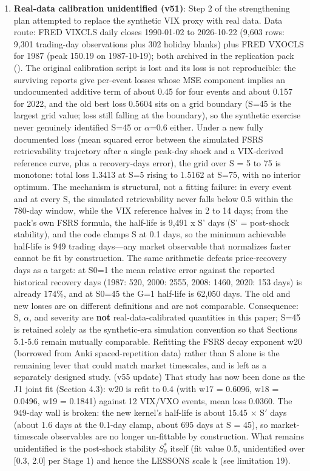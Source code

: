 \documentclass[11pt]{article}
\begin{document}
\begin{enumerate}
\item \textbf{Real-data calibration unidentified (v51)}: Step 2 of the strengthening plan attempted to replace the synthetic VIX proxy with real data. Data route: FRED VIXCLS daily closes 1990-01-02 to 2026-10-22 (9,603 rows: 9,301 trading-day observations plus 302 holiday blanks) plus FRED VXOCLS for 1987 (peak 150.19 on 1987-10-19); both archived in the replication pack (). The original calibration script is lost and its loss is not reproducible: the surviving reports give per-event losses whose MSE component implies an undocumented additive term of about 0.45 for four events and about 0.157 for 2022, and the old best loss 0.5604 sits on a grid boundary (S=45 is the largest grid value; loss still falling at the boundary), so the synthetic exercise never genuinely identified S=45 or $\alpha$=0.6 either. Under a new fully documented loss (mean squared error between the simulated FSRS retrievability trajectory after a single peak-day shock and a VIX-derived reference curve, plus a recovery-days error), the grid over S = 5 to 75 is monotone: total loss 1.3413 at S=5 rising to 1.5162 at S=75, with no interior optimum. The mechanism is structural, not a fitting failure: in every event and at every S, the simulated retrievability never falls below 0.5 within the 780-day window, while the VIX reference halves in 2 to 14 days; from the pack's own FSRS formula, the half-life is 9,491 x S' days (S' = post-shock stability), and the code clamps S at 0.1 days, so the minimum achievable half-life is 949 trading days---any market observable that normalizes faster cannot be fit by construction. The same arithmetic defeats price-recovery days as a target: at S0=1 the mean relative error against the reported historical recovery days (1987: 520, 2000: 2555, 2008: 1460, 2020: 153 days) is already 174\%, and at S0=45 the G=1 half-life is 62,050 days. The old and new losses are on different definitions and are not comparable. Consequence: S, $\alpha$, and severity are \textbf{not} real-data-calibrated quantities in this paper; S=45 is retained solely as the synthetic-era simulation convention so that Sections 5.1-5.6 remain mutually comparable. Refitting the FSRS decay exponent w20 (borrowed from Anki spaced-repetition data) rather than S alone is the remaining lever that could match market timescales, and is left as a separately designed study. (v55 update) That study has now been done as the J1 joint fit (Section 4.3): w20 is refit to 0.4 (with w17 = 0.6096, w18 = 0.0496, w19 = 0.1841) against 12 VIX/VXO events, mean loss 0.0360. The 949-day wall is broken: the new kernel's half-life is about 15.45 $\times$ S$'$ days (about 1.6 days at the 0.1-day clamp, about 695 days at S = 45), so market-timescale observables are no longer un-fittable by construction. What remains unidentified is the post-shock stability $S_0^*$ itself (fit value 0.5, unidentified over [0.3, 2.0] per Stage 1) and hence the LESSONS scale k (see limitation 19).

\end{enumerate}
\end{document}
